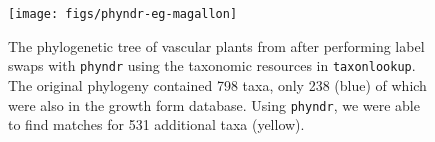 \documentclass[a4paper,11pt]{article}
\newcommand{\phyndr}{\tt phyndr}
\newcommand{\taxonlookup}{\tt taxonlookup}
\begin{document}
\begin{figure}[p]
\texttt{[image: figs/phyndr-eg-magallon]}
\caption{The phylogenetic tree of vascular plants from \citet{Magallon2015} after performing label swaps with {\phyndr} using the taxonomic resources in {\taxonlookup}. The original phylogeny contained 798 taxa, only 238 (blue) of which were also in the growth form database. Using {\phyndr}, we were able to find matches for 531 additional taxa (yellow).}
\label{fig:plant-tree}
\end{figure}
\end{document}
